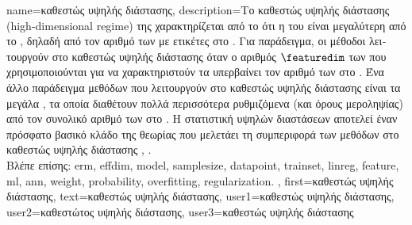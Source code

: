 {name={\foreignlanguage{greek}{καθεστώς υψηλής διάστασης}}, 
	description={\foreignlanguage{greek}{Το καθεστώς υψηλής διάστασης} 
		(high-dimensional regime) \foreignlanguage{greek}{της}  \foreignlanguage{greek}{χαρακτηρίζεται από το ότι η} 
		 \foreignlanguage{greek}{του}  \foreignlanguage{greek}{είναι μεγαλύτερη από το}
		, \foreignlanguage{greek}{δηλαδή από τον αριθμό των}  \foreignlanguage{greek}{με ετικέτες 
		στο} . \foreignlanguage{greek}{Για παράδειγμα, οι μέθοδοι}  \foreignlanguage{greek}{λειτουργούν 
		στο καθεστώς υψηλής διάστασης όταν ο αριθμός $\featuredim$ των}  \foreignlanguage{greek}{που χρησιμοποι\-ού\-νται 
		για να χαρακτηριστούν τα}  \foreignlanguage{greek}{υπερβαίνει τον αριθμό των}  
		\foreignlanguage{greek}{στο} . 
		\foreignlanguage{greek}{Ένα άλλο παράδειγμα μεθόδων}  \foreignlanguage{greek}{που λειτουργούν στο καθεστώς υψηλής 
		διάστασης είναι τα μεγάλα} , \foreignlanguage{greek}{τα οποία διαθέτουν πολλά περισσότερα ρυθμιζόμενα} 
		 \foreignlanguage{greek}{(και όρους μεροληψίας) από τον συνολικό αριθμό των}  
		 \foreignlanguage{greek}{στο} . \foreignlanguage{greek}{Η στατιστική υψηλών διαστάσεων αποτελεί 
		έναν πρόσφατο βασικό κλάδο της θεωρίας}  \foreignlanguage{greek}{που μελετάει τη συμπεριφορά των μεθόδων}  
		 \foreignlanguage{greek}{στο καθεστώς υψηλής διάστασης} \cite{Wain2019}, \cite{BuhlGeerBook}.
				\\
		\foreignlanguage{greek}{Βλέπε επίσης:} \gls{erm}, \gls{effdim}, \gls{model}, \gls{samplesize}, \gls{datapoint}, \gls{trainset}, \gls{linreg}, \gls{feature},
		\gls{ml}, \gls{ann}, \gls{weight}, \gls{probability}, \gls{overfitting}, \gls{regularization}. },
   	first={\foreignlanguage{greek}{καθεστώς υψηλής διάστασης}},
   	text={\foreignlanguage{greek}{καθεστώς υψηλής διάστασης}},
	user1={\foreignlanguage{greek}{καθεστώς υψηλής διάστασης}}, %
  	user2={\foreignlanguage{greek}{καθεστώτος υψηλής διάστασης}}, %
	user3={\foreignlanguage{greek}{καθεστώς υψηλής διάστασης}} %
}

